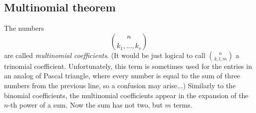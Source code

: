 

\setcounter{section}{4}
\setcounter{subsection}{2}
\setcounter{dfn}{1}

\subsection{Multinomial theorem}
The numbers
\[
\binom{n}{k_1, \ldots, k_r}
\]
are called \emph{multinomial coefficients}.
(It would be just logical to call $\binom{n}{k, l, m}$ a trinomial coefficient.
Unfortunately, this term is sometimes used for the entries in an analog of Pascal triangle,
where every number is equal to the sum of three numbers from the previous line, so a confusion may arise...)
Similarly to the binomial coefficients, the multinomial coefficients appear in the expansion of the $n$-th power of a sum.
Now the sum has not two, but $m$ terms.


